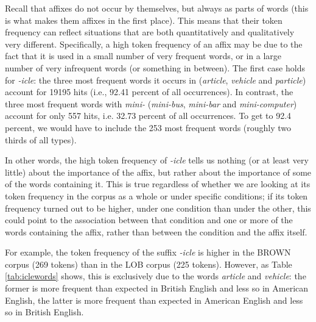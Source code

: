 Recall that affixes do not occur by themselves, but always as parts of words (this is what makes them affixes in the first place). This means that their token frequency can reflect situations that are both quantitatively and qualitatively very different. Specifically, a high token frequency of an affix may be due to the fact that it is used in a small number of very frequent words, or in a large number of very infrequent words (or something in between). The first case holds for \textit{-icle}: the three most frequent words it occurs in (\textit{article}, \textit{vehicle} and \textit{particle}) account for \num{19195} hits (i.e., 92.41 percent of all occurrences). In contrast, the three most frequent words with \textit{mini-} (\textit{mini-bus}, \textit{mini-bar} and \textit{mini-computer}) account for only 557 hits, i.e. 32.73 percent of all occurrences. To get to 92.4 percent, we would have to include the 253 most frequent words (roughly two thirds of all types).

In other words, the high token frequency of \textit{-icle} tells us nothing (or at least very little) about the importance of the affix, but rather about the importance of some of the words containing it. This is true regardless of whether we are looking at its token frequency in the corpus as a whole or under specific conditions; if its token frequency turned out to be higher, under one condition than under the other, this could point to the association between that condition and one or more of the words containing the affix, rather than between the condition and the affix itself.

For example, the token frequency of the suffix \textit{-icle} is higher in the BROWN corpus (269 tokens) than in the LOB corpus (225 tokens). However, as Table \ref{tab:iclewords} shows, this is exclusively due to the words \textit{article} and \textit{vehicle}: the former is more frequent than expected in British English and less so in American English, the latter is more frequent than expected in American English and less so in British English.


